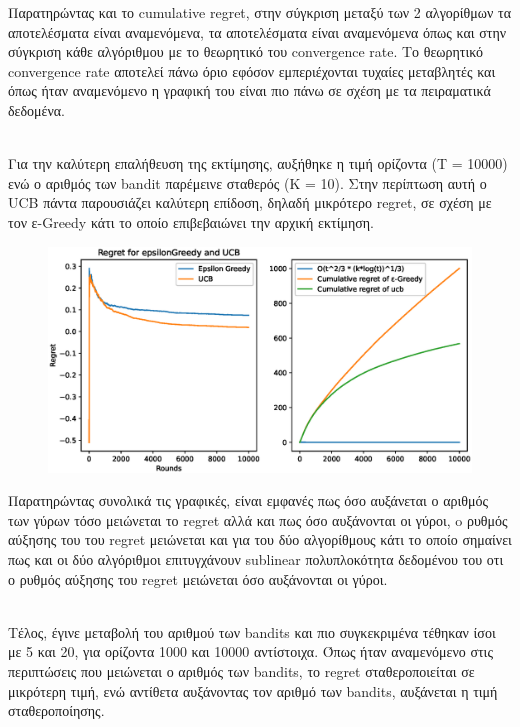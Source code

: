 \noindent
Παρατηρώντας και το cumulative regret, στην σύγκριση μεταξύ των 2 αλγορίθμων τα αποτελέσματα είναι αναμενόμενα, τα αποτελέσματα είναι αναμενόμενα όπως και στην σύγκριση κάθε αλγόριθμου με το θεωρητικό του convergence rate. Το θεωρητικό convergence rate αποτελεί πάνω όριο εφόσον εμπεριέχονται τυχαίες μεταβλητές και όπως ήταν αναμενόμενο η γραφική του είναι πιο πάνω σε σχέση με τα πειραματικά δεδομένα.

\noindent\\
Για την καλύτερη επαλήθευση της εκτίμησης, αυξήθηκε η τιμή ορίζοντα (Τ = 10000) ενώ ο αριθμός των bandit παρέμεινε σταθερός (Κ = 10). Στην περίπτωση αυτή ο UCB πάντα παρουσιάζει καλύτερη επίδοση, δηλαδή μικρότερο regret, σε σχέση με τον ε-Greedy κάτι το οποίο επιβεβαιώνει την αρχική εκτίμηση. 


\begin{figure}[h]
	\centering
	\includegraphics[width=.6\linewidth]{Images/Regret10_10000.eps} 
	\label{fig:epsilon_10000}
\end{figure}


\noindent
Παρατηρώντας συνολικά τις γραφικές, είναι εμφανές πως όσο αυξάνεται ο αριθμός των γύρων τόσο μειώνεται το regret αλλά και πως όσο αυξάνονται οι γύροι, o ρυθμός αύξησης του του regret μειώνεται και για του δύο αλγορίθμους κάτι το οποίο σημαίνει πως και οι δύο αλγόριθμοι επιτυγχάνουν sublinear πολυπλοκότητα δεδομένου του οτι ο ρυθμός αύξησης του regret μειώνεται όσο αυξάνονται οι γύροι.

\noindent\\
Τέλος, έγινε μεταβολή του αριθμού των bandits και πιο συγκεκριμένα τέθηκαν ίσοι με 5 και 20, για ορίζοντα 1000 και 10000 αντίστοιχα. Όπως ήταν αναμενόμενο στις περιπτώσεις που μειώνεται ο αριθμός των bandits, το regret σταθεροποιείται σε μικρότερη τιμή, ενώ αντίθετα αυξάνοντας τον αριθμό των bandits, αυξάνεται η τιμή σταθεροποίησης.



